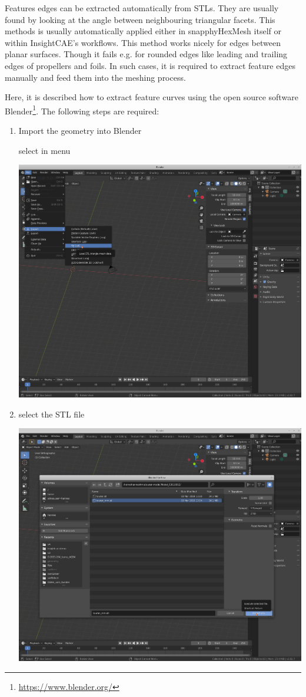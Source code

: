 Features edges can be extracted automatically from STLs. 
They are usually found by looking at the angle between neighbouring triangular facets.
This methods is usually automatically applied either in snapphyHexMesh itself or within InsightCAE's workflows.
This method works nicely for edges between planar surfaces.
Though it fails e.g. for rounded edges like leading and trailing edges of propellers and foils.
In such cases, it is required to extract feature edges manually and feed them into the meshing process.

Here, it is described how to extract feature curves using the open source software Blender\footnote{\url{https://www.blender.org/}}.
The following steps are required:
\begin{enumerate}
\item Import the geometry into Blender

select in menu 

\includegraphics[width=0.75\linewidth]{figs/feature_edges_blender/01_import_stl_1}

\item select the STL file

\includegraphics[width=0.75\linewidth]{figs/feature_edges_blender/02_import_stl_2}


\end{enumerate}
